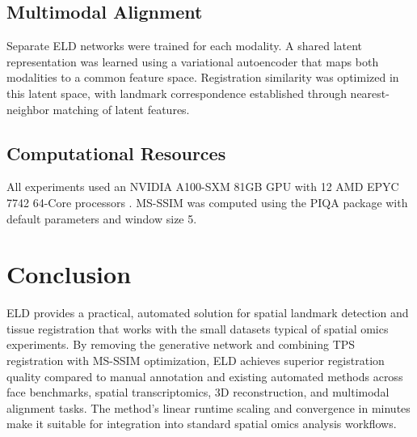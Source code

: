 \documentclass[11pt]{article}
\begin{document}
\subsection{Multimodal Alignment}

Separate ELD networks were trained for each modality. A shared latent representation was learned using a variational autoencoder that maps both modalities to a common feature space. Registration similarity was optimized in this latent space, with landmark correspondence established through nearest-neighbor matching of latent features.

\subsection{Computational Resources}

All experiments used an NVIDIA A100-SXM 81GB GPU with 12 AMD EPYC 7742 64-Core processors \citep{a100_gpu2020}. MS-SSIM was computed using the PIQA package with default parameters and window size 5.

\section{Conclusion}

ELD provides a practical, automated solution for spatial landmark detection and tissue registration that works with the small datasets typical of spatial omics experiments. By removing the generative network and combining TPS registration with MS-SSIM optimization, ELD achieves superior registration quality compared to manual annotation and existing automated methods across face benchmarks, spatial transcriptomics, 3D reconstruction, and multimodal alignment tasks. The method's linear runtime scaling and convergence in minutes make it suitable for integration into standard spatial omics analysis workflows.



\end{document}
